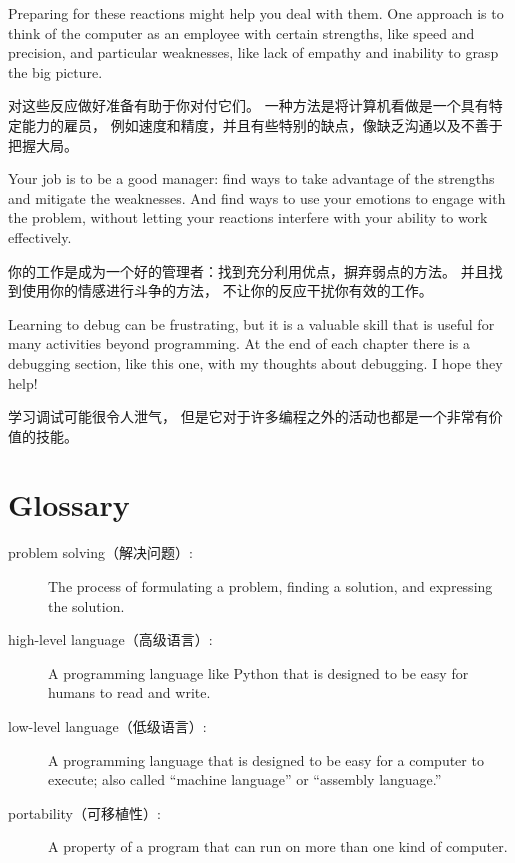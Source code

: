 \documentclass[10pt]{book}
\begin{document}
\begin{CJK}{UTF8}{gbsn}
Preparing for these reactions might help you deal with them.
One approach is to think of the computer as an employee with
certain strengths, like speed and precision, and
particular weaknesses, like lack of empathy and inability
to grasp the big picture.

对这些反应做好准备有助于你对付它们。
一种方法是将计算机看做是一个具有特定能力的雇员，
例如速度和精度，并且有些特别的缺点，像缺乏沟通以及不善于把握大局。

Your job is to be a good manager: find ways to take advantage
of the strengths and mitigate the weaknesses.  And find ways
to use your emotions to engage with the problem,
without letting your reactions interfere with your ability
to work effectively.

你的工作是成为一个好的管理者：找到充分利用优点，摒弃弱点的方法。
并且找到使用你的情感进行斗争的方法，
不让你的反应干扰你有效的工作。

Learning to debug can be frustrating, but it is a valuable skill
that is useful for many activities beyond programming.  At the
end of each chapter there is a debugging section, like this one,
with my thoughts about debugging.  I hope they help!

学习调试可能很令人泄气，
但是它对于许多编程之外的活动也都是一个非常有价值的技能。

\section{Glossary}

\begin{description}

\item[problem solving（解决问题）:]  The process of formulating a problem, finding
a solution, and expressing the solution.

\item[high-level language（高级语言）:]  A programming language like Python that
is designed to be easy for humans to read and write.

\item[low-level language（低级语言）:]  A programming language that is designed
to be easy for a computer to execute; also called ``machine language'' or
``assembly language.''

\item[portability（可移植性）:]  A property of a program that can run on more
than one kind of computer.


\end{description}
\end{CJK}
\end{document}
